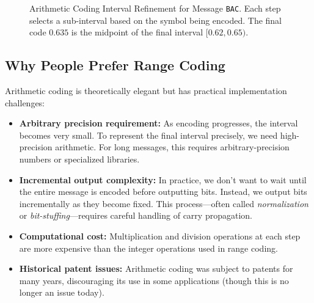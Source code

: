 \documentclass[12pt]{article}
\begin{document}
\begin{figure}[h!]
\caption{Arithmetic Coding Interval Refinement for Message \texttt{BAC}. 
Each step selects a sub-interval based on the symbol being encoded. 
The final code $0.635$ is the midpoint of the final interval $[0.62,0.65)$.}
\label{fig:arithmetic}
\end{figure}

\subsection{Why People Prefer Range Coding}

Arithmetic coding is theoretically elegant but has practical implementation challenges:

\begin{itemize}
    \item \textbf{Arbitrary precision requirement:} As encoding progresses, the interval becomes very small. To represent the final interval precisely, we need high-precision arithmetic. For long messages, this requires arbitrary-precision numbers or specialized libraries.
    
    \item \textbf{Incremental output complexity:} In practice, we don't want to wait until the entire message is encoded before outputting bits. Instead, we output bits incrementally as they become fixed. This process—often called \textit{normalization} or \textit{bit-stuffing}—requires careful handling of carry propagation.
    
    \item \textbf{Computational cost:} Multiplication and division operations at each step are more expensive than the integer operations used in range coding.
    
    \item \textbf{Historical patent issues:} Arithmetic coding was subject to patents for many years, discouraging its use in some applications (though this is no longer an issue today).
\end{itemize}
\end{document}
